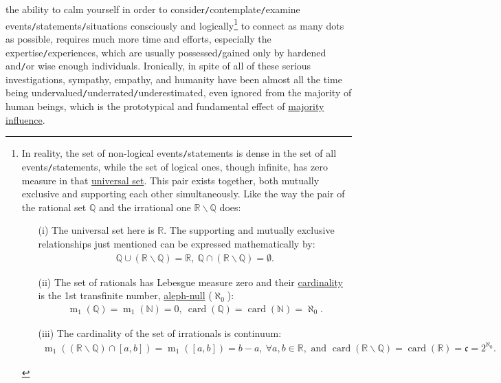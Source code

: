 \documentclass[12pt]{article}
\numberwithin{equation}{section}
\begin{document}
the ability to calm yourself in order to consider\texttt{/}contemplate\texttt{/}examine events\texttt{/}statements\texttt{/}situations consciously and logically\footnote{In reality, the set of non-logical events\texttt{/}statements is dense in the set of all events\texttt{/}statements, while the set of logical ones, though infinite, has zero measure in that \href{https://en.wikipedia.org/wiki/Universal_set}{universal set}. This pair exists together, both mutually exclusive and supporting each other simultaneously. Like the way the pair of the rational set $\mathbb{Q}$ and the irrational one $\mathbb{R}\backslash\mathbb{Q}$ does:
\begin{itemize}
    \item[(i)] The universal set here is $\mathbb{R}$. The supporting and mutually exclusive relationships just mentioned can be expressed mathematically by:
    \begin{align*}
        \mathbb{Q}\cup(\mathbb{R}\backslash\mathbb{Q}) = \mathbb{R},\ \mathbb{Q}\cap(\mathbb{R}\backslash\mathbb{Q}) = \emptyset.
    \end{align*}
    \item[(ii)] The set of rationals has Lebesgue measure zero and their \href{https://en.wikipedia.org/wiki/Cardinality}{cardinality} is the 1st transfinite number, \href{https://en.wikipedia.org/wiki/Aleph_number}{aleph-null} ($\aleph_0$):
    \begin{align*}
        \operatorname{m}_1(\mathbb{Q}) = \operatorname{m}_1(\mathbb{N}) = 0,\ \operatorname{card}(\mathbb{Q}) = \operatorname{card}(\mathbb{N}) = \aleph_0.
    \end{align*}
    \item[(iii)] The cardinality of the set of irrationals is continuum:
    \begin{align*}
        \operatorname{m}_1((\mathbb{R}\backslash\mathbb{Q})\cap[a,b]) = \operatorname{m}_1([a,b]) = b - a,\ \forall a,b\in\mathbb{R}, \mbox{ and } \operatorname{card}(\mathbb{R}\backslash\mathbb{Q}) = \operatorname{card}(\mathbb{R}) = \mathfrak{c} = 2^{\aleph_0}.
    \end{align*}
\end{itemize}} to connect as many dots as possible, requires much more time and efforts, especially the expertise\texttt{/}experiences, which are usually possessed\texttt{/}gained only by hardened and\texttt{/}or wise enough individuals. Ironically, in spite of all of these serious investigations, sympathy, empathy, and humanity have been almost all the time being undervalued\texttt{/}underrated\texttt{/}underestimated, even ignored from the majority of human beings, which is the prototypical and fundamental effect of \href{https://dictionary.apa.org/majority-influence}{majority influence}.
\end{document}
